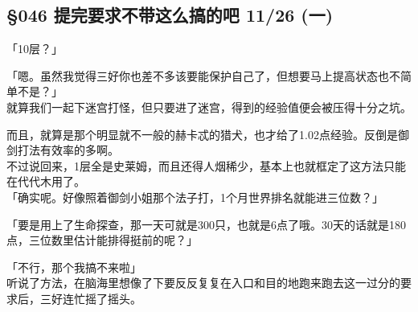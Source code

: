 \subsection{§046 提完要求不带这么搞的吧 11/26 (一)}

「10层？」

「嗯。虽然我觉得三好你也差不多该要能保护自己了，但想要马上提高状态也不简单不是？」\\

就算我们一起下迷宫打怪，但只要进了迷宫，得到的经验值便会被压得十分之坑。

而且，就算是那个明显就不一般的赫卡忒的猎犬，也才给了1.02点经验。反倒是御剑打法有效率的多啊。\\

不过说回来，1层全是史莱姆，而且还得人烟稀少，基本上也就框定了这方法只能在代代木用了。\\

「确实呢。好像照着御剑小姐那个法子打，1个月世界排名就能进三位数？」

「要是用上了生命探查，那一天可就是300只，也就是6点了哦。30天的话就是180点，三位数里估计能排得挺前的呢？」

「不行，那个我搞不来啦」\\

听说了方法，在脑海里想像了下要反反复复在入口和目的地跑来跑去这一过分的要求后，三好连忙摇了摇头。

